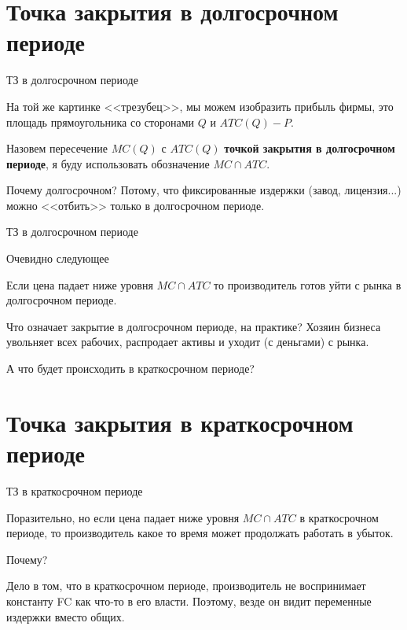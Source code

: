 \documentclass{beamer}
\begin{document}
\section{Точка закрытия в долгосрочном периоде}

\begin{frame}{ТЗ в долгосрочном периоде}

На той же картинке <<трезубец>>, мы можем изобразить прибыль фирмы, это площадь прямоугольника со сторонами $Q$ и $ATC(Q)-P$. 

\begin{definition}
Назовем пересечение $MC(Q)$ с $ATC(Q)$ \textbf{точкой закрытия в долгосрочном периоде}, я буду использовать обозначение $MC \cap ATC$.
\end{definition}

Почему долгосрочном? Потому, что фиксированные издержки (завод, лицензия...) можно <<отбить>> только в долгосрочном периоде. 

\end{frame}

\begin{frame}{ТЗ в долгосрочном периоде}

Очевидно следующее

\begin{lemma}
Если цена падает ниже уровня $MC \cap ATC$ то производитель готов уйти с рынка в долгосрочном периоде.
\end{lemma}

Что означает закрытие в долгосрочном периоде, на практике? Хозяин бизнеса увольняет всех рабочих, распродает активы и уходит (с деньгами) с рынка.

А что будет происходить в краткосрочном периоде?

\end{frame}

\section{Точка закрытия в краткосрочном периоде}

\begin{frame}{ТЗ в краткосрочном периоде}

Поразительно, но если цена падает ниже уровня $MC \cap ATC$ в краткосрочном периоде, то производитель какое то время может продолжать работать в убыток.

Почему?

Дело в том, что в краткосрочном периоде, производитель не воспринимает константу FC как что-то в его власти. Поэтому, везде он видит переменные издержки вместо общих.
\end{frame}
\end{document}
